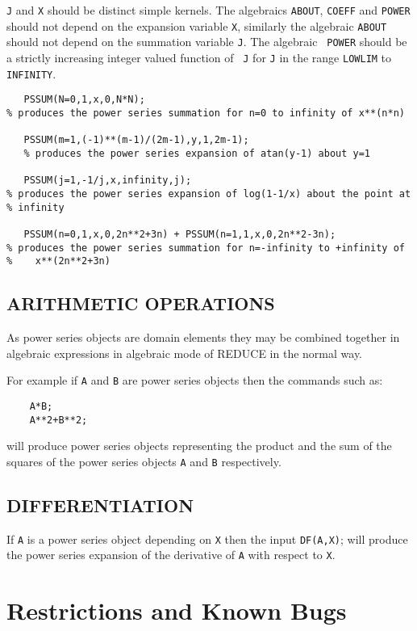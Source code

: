 {\tt J} and {\tt X} should be distinct simple kernels. The algebraics
{\tt ABOUT},  {\tt COEFF} and {\tt POWER} should not depend on the
expansion variable {\tt X}, similarly the algebraic {\tt ABOUT} should
not depend on the summation variable {\tt J}.  The algebraic {\tt
POWER} should be a strictly increasing integer valued function of {\tt
J} for {\tt J} in the range {\tt LOWLIM} to {\tt INFINITY}.

\begin{verbatim}
   PSSUM(N=0,1,x,0,N*N);
% produces the power series summation for n=0 to infinity of x**(n*n)

   PSSUM(m=1,(-1)**(m-1)/(2m-1),y,1,2m-1);
   % produces the power series expansion of atan(y-1) about y=1

   PSSUM(j=1,-1/j,x,infinity,j);
% produces the power series expansion of log(1-1/x) about the point at
% infinity

   PSSUM(n=0,1,x,0,2n**2+3n) + PSSUM(n=1,1,x,0,2n**2-3n);
% produces the power series summation for n=-infinity to +infinity of
%    x**(2n**2+3n)
\end{verbatim}

\subsection*{ARITHMETIC OPERATIONS}
 
As power series objects are domain elements they may be combined
together in algebraic expressions in algebraic mode of REDUCE in the
normal way.
 
For example if {\tt A} and {\tt B} are power
series objects then the commands such as:
\begin{verbatim}
    A*B;
    A**2+B**2;
\end{verbatim}
will produce power series objects representing the product and the sum
of the squares of the power series objects {\tt A} and {\tt B}
respectively.
 
\subsection*{DIFFERENTIATION}
 
If {\tt A} is a power series object depending on {\tt X} then the input
{\tt DF(A,X)}; will produce the power series expansion of the derivative
of {\tt A} with respect to {\tt X}.


\section*{Restrictions and Known Bugs}

